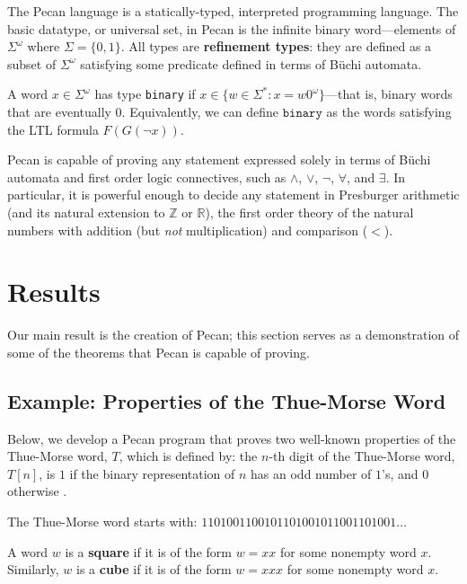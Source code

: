 \documentclass[10pt,usenames,dvipsnames]{article}
\begin{document}
The Pecan language is a statically-typed, interpreted programming language.
The basic datatype, or universal set, in Pecan is the infinite binary word---elements of $\Sigma^{\omega}$ where $\Sigma = \{0,1\}$.
All types are \textbf{refinement types}: they are defined as a subset of $\Sigma^{\omega}$ satisfying some predicate defined in terms of B\"uchi automata.

\begin{example}
A word $x \in \Sigma^\omega$ has type \texttt{binary} if $x \in \{ w \in \Sigma^* : x = w0^\omega \}$---that is, binary words that are eventually $0$.
Equivalently, we can define $\texttt{binary}$ as the words satisfying the LTL formula $F(G(\neg x))$.
\end{example}

Pecan is capable of proving any statement expressed solely in terms of B\"uchi automata and first order logic connectives, such as $\wedge$, $\vee$, $\neg$, $\forall$, and $\exists$.
In particular, it is powerful enough to decide any statement in Presburger arithmetic (and its natural extension to $\mathbb{Z}$ or $\mathbb{R}$), the first order theory of the natural numbers with addition (but \emph{not} multiplication) and comparison ($<$).

\section{Results}

Our main result is the creation of Pecan; this section serves as a demonstration of some of the theorems that Pecan is capable of proving.

\subsection*{Example: Properties of the Thue-Morse Word}

Below, we develop a Pecan program that proves two well-known properties of the Thue-Morse word, $T$, which is defined by: the $n$-th digit of the Thue-Morse word, $T[n]$, is $1$ if the binary representation of $n$ has an odd number of $1$'s, and $0$ otherwise \cite{auto_seq}.

The Thue-Morse word starts with: $1101001100101101001011001101001\ldots$
\begin{definition}
    A word $w$ is a \textbf{square} if it is of the form $w = xx$ for some nonempty word $x$.
    Similarly, $w$ is a \textbf{cube} if it is of the form $w = xxx$ for some nonempty word $x$.
\end{definition}
\end{document}
